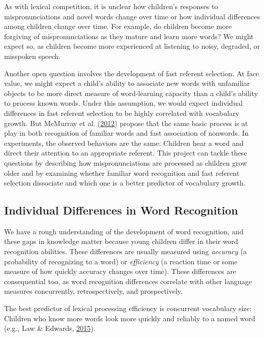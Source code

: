 \documentclass [11pt, proquest] {uwthesis}[2015/03/03]
\begin{document}
As with lexical competition, it is unclear how children's responses to
mispronunciations and novel words change over time or how individual
differences among children change over time. For example, do children
become more forgiving of mispronunciations as they mature and learn more
words? We might expect so, as children become more experienced at
listening to noisy, degraded, or misspoken speech.

Another open question involves the development of fast referent
selection. At face value, we might expect a child's ability to associate
new words with unfamiliar objects to be more direct measure of
word-learning capacity than a child's ability to process known words.
Under this assumption, we would expect individual differences in fast
referent selection to be highly correlated with vocabulary growth. But
McMurray et al. (\protect\hyperlink{ref-McMurray2012}{2012}) propose
that the same basic process is at play in both recognition of familiar
words and fast association of nonwords. In experiments, the observed
behaviors are the same: Children hear a word and direct their attention
to an appropriate referent. This project can tackle these questions by
describing how mispronunciations are processed as children grow older
and by examining whether familiar word recognition and fast referent
selection dissociate and which one is a better predictor of vocabulary
growth.

\subsection{Individual Differences in Word
Recognition}\label{individual-differences-in-word-recognition}

We have a rough understanding of the development of word recognition,
and these gaps in knowledge matter because young children differ in
their word recognition abilities. These differences are usually measured
using \emph{accuracy} (a probability of recognizing to a word) or
\emph{efficiency} (a reaction time or some measure of how quickly
accuracy changes over time). These differences are consequential too, as
word recognition differences correlate with other language measures
concurrently, retrospectively, and prospectively.

The best predictor of lexical processing efficiency is concurrent
vocabulary size: Children who know more words look more quickly and
reliably to a named word (e.g., Law \& Edwards,
\protect\hyperlink{ref-MPPaper}{2015}).
\end{document}
